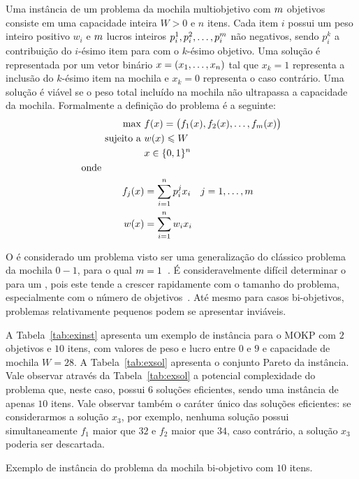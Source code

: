 Uma instância de um problema da mochila multiobjetivo com $m$
objetivos consiste em uma capacidade inteira $W >0$ e $n$ itens.
Cada item $i$ possui um peso inteiro positivo $w_i$ e $m$ lucros inteiros
$p_i^1, p_i^2, \ldots, p_{i}^{m}$ não negativos,
sendo $p_i^k$ a contribuição do $i$-ésimo item para com o $k$-ésimo objetivo.
Uma solução é representada por um vetor binário $x = (x_1, \ldots, x_n)$
tal que $x_k = 1$ representa a inclusão do $k$-ésimo item na mochila e $x_k = 0$
representa o caso contrário.
Uma solução é viável se o peso total incluído na mochila não ultrapassa
a capacidade da mochila.
Formalmente a definição do problema é a seguinte:
\begin{align*}
  \text{max   } & f(x) =
    \big(f_1(x) ,f_2(x) ,\ldots ,f_{m}(x)\big) \\
  \text{sujeito a   } & w(x) \leqslant W \\
  & x \in \{0, 1\}^n\\
  \text{onde} \phantom{mmmmm} \\
  f_j(x) &= \sum_{i = 1}^n p^j_i x_i \quad j = 1, \ldots, m\\
  w(x) &= \sum_{i = 1}^n w_i x_i
\end{align*}

O \mokp{} é considerado um problema \nphard{} visto ser uma generalização
do clássico problema da mochila $0-1$, para o qual $m = 1$~\cite{garey2002computers}.
É consideravelmente difícil determinar o \paretoset{} para um \mokp{},
pois este tende a crescer rapidamente com o tamanho do problema,
especialmente com o número de objetivos~\cite{ishibuchi2008evolutionary}.
Até mesmo para casos bi-objetivos, problemas relativamente pequenos podem se apresentar
inviáveis.

A Tabela~\ref{tab:exinst} apresenta um exemplo de instância para o MOKP
com $2$ objetivos e $10$ itens, com valores de peso e lucro entre $0$ e $9$ e capacidade
de mochila $W = 28$.
A Tabela~\ref{tab:exsol} apresenta o conjunto Pareto da instância.
Vale observar através da Tabela~\ref{tab:exsol} a potencial complexidade do problema que, neste caso,
possui $6$ soluções eficientes, sendo uma instância de apenas $10$ itens.
Vale observar também o caráter único das soluções eficientes:
se considerarmos a solução $x_{3}$, por exemplo, nenhuma solução
possui simultaneamente $f_1$ maior que $32$ e $f_2$ maior que $34$, caso contrário,
a solução $x_{3}$ poderia ser descartada.

\begin{table}[ht]
  
  \caption{Exemplo de instância do problema da mochila bi-objetivo com $10$ itens.}
  \label{tab:exinst}
\end{table}

